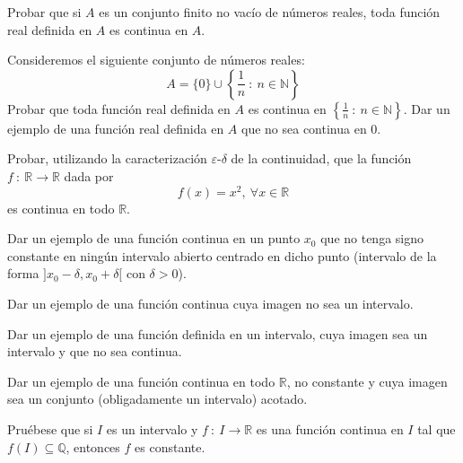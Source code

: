 \begin{ejercicio}
    Probar que si $A$ es un conjunto finito no vacío de números reales, toda función real definida en $A$ es continua en $A$.
\end{ejercicio}

\begin{ejercicio}
    Consideremos el siguiente conjunto de números reales:
    \begin{equation*}
        A = \{0\} \cup \left\{\frac{1}{n} ~:~ n \in \mathbb{N}\right\}
    \end{equation*}
    Probar que toda función real definida en $A$ es continua en $\left\{\frac{1}{n} ~:~ n \in \mathbb{N}\right\}$.
    Dar un ejemplo de una función real definida en $A$ que no sea continua en $0$.
\end{ejercicio}

\begin{ejercicio}
    Probar, utilizando la caracterización $\varepsilon \text{-} \delta$ de la continuidad, que la función
    $f ~:~ \mathbb{R} \longrightarrow \mathbb{R}$ dada por
    \begin{equation*}
        f(x) = x^2, ~ \forall x \in \mathbb{R}
    \end{equation*}
    es continua en todo $\mathbb{R}$.
\end{ejercicio}

\begin{ejercicio}
    Dar un ejemplo de una función continua en un punto $x_0$ que no tenga signo constante en ningún intervalo abierto centrado en dicho punto (intervalo de la forma $]x_0-\delta,x_0+\delta[$ con $\delta > 0$).
\end{ejercicio}

\begin{ejercicio}
    Dar un ejemplo de una función continua cuya imagen no sea un intervalo.
\end{ejercicio}

\begin{ejercicio}
    Dar un ejemplo de una función definida en un intervalo, cuya imagen sea un intervalo y que no sea continua.
\end{ejercicio}

\begin{ejercicio}
    Dar un ejemplo de una función continua en todo $\mathbb{R}$, no constante y cuya imagen sea un conjunto (obligadamente un intervalo) acotado.
\end{ejercicio}

\begin{ejercicio}
    Pruébese que si $I$ es un intervalo y $f ~:~ I \longrightarrow \mathbb{R}$ es una función continua en $I$ tal que $f(I) \subseteq \mathbb{Q}$, entonces $f$ es constante.
\end{ejercicio}

